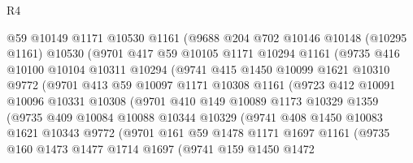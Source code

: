 \begin{lexlean}{R4}
\begin{coremodule}
              @59
              @10149
              @1171
              @10530
              @1161
              (@9688
                @204
                @702
                @10146
                @10148
                (@10295 @1161)
                @10530
                (@9701
                  @417
                  @59
                  @10105
                  @1171
                  @10294
                  @1161
                  (@9735
                    @416
                    @10100
                    @10104
                    @10311
                    @10294
                    (@9741
                      @415
                      @1450
                      @10099
                      @1621
                      @10310
                      @9772
                      (@9701
                        @413
                        @59
                        @10097
                        @1171
                        @10308
                        @1161
                        (@9723
                          @412
                          @10091
                          @10096
                          @10331
                          @10308
                          (@9701
                            @410
                            @149
                            @10089
                            @1173
                            @10329
                            @1359
                            (@9735
                              @409
                              @10084
                              @10088
                              @10344
                              @10329
                              (@9741
                                @408
                                @1450
                                @10083
                                @1621
                                @10343
                                @9772
                                (@9701
                                  @161
                                  @59
                                  @1478
                                  @1171
                                  @1697
                                  @1161
                                  (@9735
                                    @160
                                    @1473
                                    @1477
                                    @1714
                                    @1697
                                    (@9741
                                      @159
                                      @1450
                                      @1472

\end{coremodule}
\end{lexlean}
